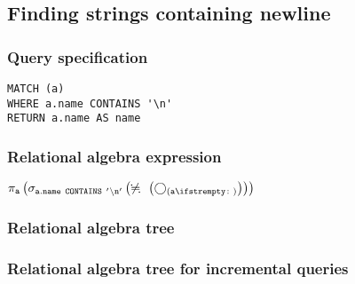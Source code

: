 \subsection{Finding strings containing newline}

\subsubsection*{Query specification}

\begin{lstlisting}
MATCH (a)
WHERE a.name CONTAINS '\n'
RETURN a.name AS name
\end{lstlisting}

\subsubsection*{Relational algebra expression}

$\projection{\var{a}} \left(\selection{\mathtt{a.name~CONTAINS~'\backslash{}n'}} \left(\alldifferent{} \left(\getvertices{a}{}\right)\right)\right)$

\subsubsection*{Relational algebra tree}


\subsubsection*{Relational algebra tree for incremental queries}


